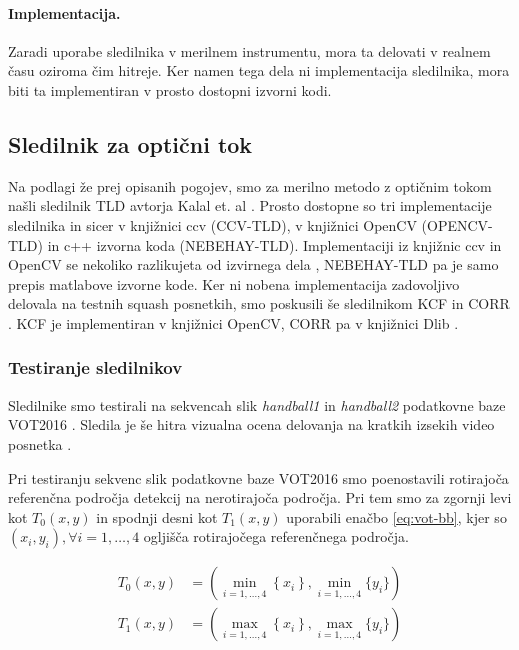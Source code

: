 \paragraph{Implementacija.} Zaradi uporabe sledilnika v merilnem instrumentu, mora ta delovati v realnem času oziroma čim hitreje. Ker namen tega dela ni implementacija sledilnika, mora biti ta implementiran v prosto dostopni izvorni kodi. 


\subsection{Sledilnik za optični tok}
Na podlagi že prej opisanih pogojev, smo za merilno metodo z optičnim tokom našli sledilnik TLD avtorja Kalal et. al \cite{kalal2012tracking}. Prosto dostopne so tri implementacije sledilnika in sicer v knjižnici ccv (CCV-TLD), v knjižnici OpenCV (OPENCV-TLD) in c++ izvorna koda (NEBEHAY-TLD). Implementaciji iz knjižnic ccv in OpenCV se nekoliko razlikujeta od izvirnega dela \cite{kalal2012tracking}, NEBEHAY-TLD pa je samo prepis matlabove izvorne kode. Ker ni nobena implementacija zadovoljivo delovala na testnih squash posnetkih, smo poskusili še sledilnikom KCF \cite{danelljan2014adaptive} in CORR \cite{danelljan2014accurate}. KCF je implementiran v knjižnici OpenCV, CORR pa v knjižnici Dlib \cite{king2009dlib}. 




\subsubsection{Testiranje sledilnikov}
Sledilnike smo testirali na sekvencah slik \textit{handball1} in \textit{handball2} podatkovne baze VOT2016 \cite{kristan2016visual}. Sledila je še hitra vizualna ocena delovanja na kratkih izsekih video posnetka \cite{squashtv2014squash}.

Pri testiranju sekvenc slik podatkovne baze VOT2016 smo poenostavili rotirajoča referenčna področja detekcij na nerotirajoča področja. Pri tem smo za zgornji levi kot $T_0(x,y)$ in spodnji desni kot $T_1(x,y)$ uporabili enačbo \eqref{eq:vot-bb}, kjer so $\left( x_i, y_i\right), \forall i=1,\ldots,4$ ogljišča rotirajočega referenčnega področja. 

\begin{equation}
\begin{aligned}
	T_0(x,y) &= \left( \min_{i = 1,\ldots,4}\left\{x_i \right\}, 
    \min_{i=1,\ldots,4}\{y_i \} \right) \\
    T_1(x,y) &= \left( \max_{i = 1,\ldots,4}\left\{x_i \right\}, 
    \max_{i=1,\ldots,4}\{y_i \} \right)
\end{aligned}
\label{eq:vot-bb}
\end{equation}

